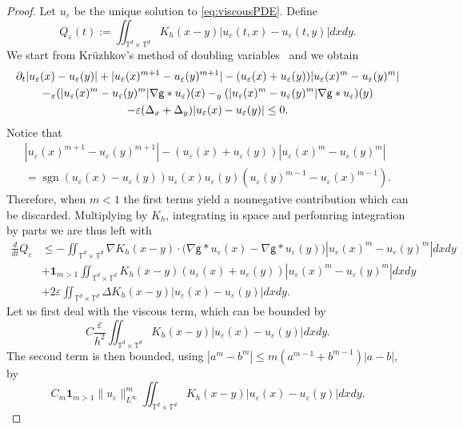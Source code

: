 \documentclass[11pt]{article}
\numberwithin{equation}{section} %
\DeclareMathOperator{\sgn}{sgn}
\newcommand{\p}{{\partial}}
\newcommand{\T}{{\mathbb{T}}}
\newcommand{\g}{{\mathsf{g}}}
\newcommand{\D}{\Delta}
\newcommand{\ep}{\varepsilon}
\let\div\relax
\DeclareMathOperator{\div}{\mathsf{div}}
\def \ep{\varepsilon}
\def\nab{\nabla}
\def\indic{\mathbf{1}}
\begin{document}
\begin{proof}
    Let $u_\ep$ be the unique solution to \eqref{eq:viscousPDE}. Define
    \begin{equation*}
        Q_\ep(t) := \iint_{\T^d\times \T^d} K_h(x-y)|u_\ep(t,x)-u_\ep(t,y)| dxdy.
    \end{equation*}
    We start from Kr\"uzhkov's method of doubling variables~\cite{MR267257} and we obtain
    \begin{multline*}
        \p_t|u_\ep(x)-u_\ep(y)| + |u_\ep(x)^{m+1}-u_\ep(y)^{m+1}| - (u_\ep(x)+u_\ep(y))|u_\ep(x)^m-u_\ep(y)^m| \\
        -\div_x (|u_\ep(x)^m-u_\ep(y)^m| \nab\g\ast u_\ep)(x) - \div_y(|u_\ep(x)^m-u_\ep(y)^m|\nab\g\ast u_\ep)(y) \\
        -\ep (\D_x+\D_y)|u_\ep(x)-u_\ep(y)|\le 0.
    \end{multline*}
    Notice that
    \begin{multline*}
        |u_\ep(x)^{m+1}-u_\ep(y)^{m+1}| - (u_\ep(x)+u_\ep(y))|u_\ep(x)^m-u_\ep(y)^m| \\
        = \sgn(u_\ep(x)-u_\ep(y)) u_\ep(x)u_\ep(y)(u_\ep(y)^{m-1}-u_\ep(x)^{m-1}).
    \end{multline*}
    Therefore, when $m<1$ the first terms yield a nonnegative contribution which can be discarded. Multiplying by $K_h$, integrating in space and perfomring integration by parts we are thus left with
    \begin{align*}
        \frac{d}{dt}Q_\ep 
        &\le -\iint_{\T^d\times\T^d} \nab K_h(x-y)\cdot \big(\nab\g\ast u_\ep(x) - \nab\g\ast u_\ep(y)\big)  |u_\ep(x)^m-u_\ep(y)^m| dxdy\\
        &+ \indic_{m>1}\iint_{\T^d\times \T^d} K_h(x-y) (u_\ep(x)+u_\ep(y)) |u_\ep(x)^m-u_\ep(y)^m|dxdy \\
        &+ 2\ep \iint_{\T^d\times\T^d} \D K_h(x-y)|u_\ep(x)-u_\ep(y)|dxdy. 
    \end{align*}
    Let us first deal with the viscous term, which can be bounded by
    \begin{equation}\label{term:viscous}
        C\frac{\ep}{h^2} \iint_{\T^d\times\T^d}K_h(x-y) |u_\ep(x)-u_\ep(y)| dxdy.
    \end{equation}
    The second term is then bounded, using $|a^m-b^m|\le m(a^{m-1}+b^{m-1})|a-b|$, by
    \begin{equation}\label{term:second}
        C_m\indic_{m>1} \|u_\ep\|_{L^\infty}^m \iint_{\T^d\times\T^d} K_h(x-y) |u_\ep(x)-u_\ep(y)|dxdy.
    \end{equation}

\end{proof}
\end{document}
